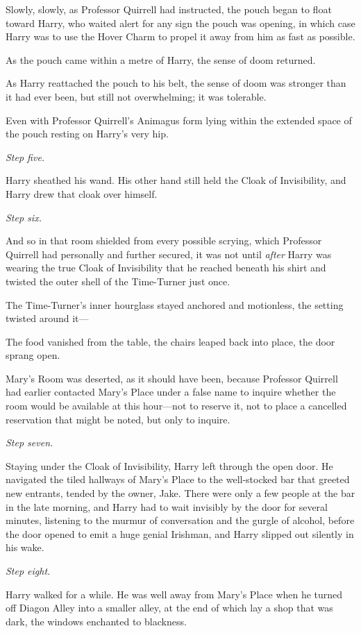 Slowly, slowly, as Professor Quirrell had instructed, the pouch began to float toward Harry, who waited alert for any sign the pouch was opening, in which case Harry was to use the Hover Charm to propel it away from him as fast as possible.

As the pouch came within a metre of Harry, the sense of doom returned.

As Harry reattached the pouch to his belt, the sense of doom was stronger than it had ever been, but still not overwhelming; it was tolerable.

Even with Professor Quirrell’s Animagus form lying within the extended space of the pouch resting on Harry’s very hip.

\emph{Step five.}

Harry sheathed his wand. His other hand still held the Cloak of Invisibility, and Harry drew that cloak over himself.

\emph{Step six.}

And so in that room shielded from every possible scrying, which Professor Quirrell had personally and further secured, it was not until \emph{after} Harry was wearing the true Cloak of Invisibility that he reached beneath his shirt and twisted the outer shell of the Time-Turner just once.

The Time-Turner’s inner hourglass stayed anchored and motionless, the setting twisted around it—

The food vanished from the table, the chairs leaped back into place, the door sprang open.

Mary’s Room was deserted, as it should have been, because Professor Quirrell had earlier contacted Mary’s Place under a false name to inquire whether the room would be available at this hour—not to reserve it, not to place a cancelled reservation that might be noted, but only to inquire.

\emph{Step seven.}

Staying under the Cloak of Invisibility, Harry left through the open door. He navigated the tiled hallways of Mary’s Place to the well-stocked bar that greeted new entrants, tended by the owner, Jake. There were only a few people at the bar in the late morning, and Harry had to wait invisibly by the door for several minutes, listening to the murmur of conversation and the gurgle of alcohol, before the door opened to emit a huge genial Irishman, and Harry slipped out silently in his wake.

\emph{Step eight.}

Harry walked for a while. He was well away from Mary’s Place when he turned off Diagon Alley into a smaller alley, at the end of which lay a shop that was dark, the windows enchanted to blackness.

